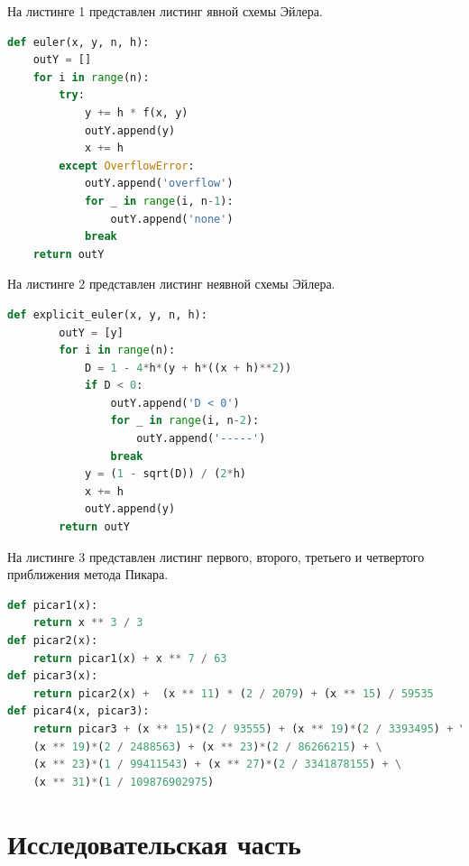 \documentclass[a4paper, 12pt]{article}
\begin{document}
	\lstset{style=mystyle}

	\hspace*{-7mm} На листинге 1 представлен листинг явной схемы Эйлера.
	\begin{lstlisting}[language=Python, caption = явная схема Эйлера]
def euler(x, y, n, h):
	outY = []
	for i in range(n):
		try:
			y += h * f(x, y)
			outY.append(y)
			x += h
		except OverflowError:
			outY.append('overflow')
			for _ in range(i, n-1):
				outY.append('none')
			break
	return outY
	\end{lstlisting}

\hspace*{-7mm} На листинге 2 представлен листинг неявной схемы Эйлера.
\begin{lstlisting}[language=Python, caption = неявная схема Эйлера]
	def explicit_euler(x, y, n, h):
		outY = [y]
		for i in range(n):
			D = 1 - 4*h*(y + h*((x + h)**2))
			if D < 0:
				outY.append('D < 0')
				for _ in range(i, n-2):
					outY.append('-----')
				break
			y = (1 - sqrt(D)) / (2*h)
			x += h
			outY.append(y)
		return outY
\end{lstlisting}
\clearpage
\newpage

\hspace*{-7mm} На листинге 3 представлен листинг первого, второго, третьего и четвертого приближения метода Пикара.
\begin{lstlisting}[language=Python]
def picar1(x):
	return x ** 3 / 3
def picar2(x):
	return picar1(x) + x ** 7 / 63
def picar3(x):
	return picar2(x) +  (x ** 11) * (2 / 2079) + (x ** 15) / 59535
def picar4(x, picar3):
	return picar3 + (x ** 15)*(2 / 93555) + (x ** 19)*(2 / 3393495) + \
	(x ** 19)*(2 / 2488563) + (x ** 23)*(2 / 86266215) + \
	(x ** 23)*(1 / 99411543) + (x ** 27)*(2 / 3341878155) + \
	(x ** 31)*(1 / 109876902975)
\end{lstlisting}	
\clearpage
\newpage
\section{Исследовательская часть }

	
\end{document}
